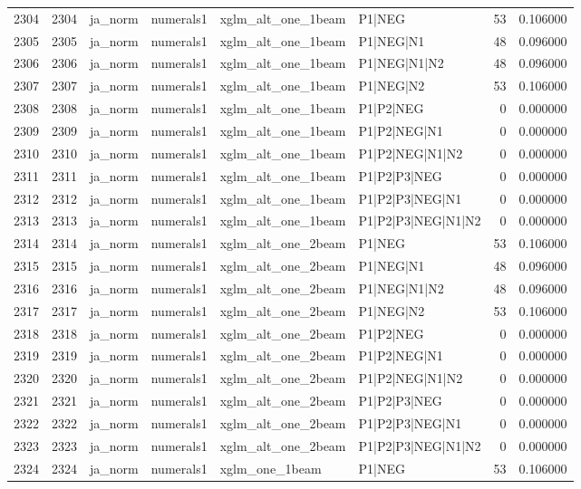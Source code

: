 \begin{tabular}{lrllllrr}
2304 & 2304 & ja_norm & numerals1 & xglm_alt_one_1beam & P1|NEG & 53 & 0.106000 \\
2305 & 2305 & ja_norm & numerals1 & xglm_alt_one_1beam & P1|NEG|N1 & 48 & 0.096000 \\
2306 & 2306 & ja_norm & numerals1 & xglm_alt_one_1beam & P1|NEG|N1|N2 & 48 & 0.096000 \\
2307 & 2307 & ja_norm & numerals1 & xglm_alt_one_1beam & P1|NEG|N2 & 53 & 0.106000 \\
2308 & 2308 & ja_norm & numerals1 & xglm_alt_one_1beam & P1|P2|NEG & 0 & 0.000000 \\
2309 & 2309 & ja_norm & numerals1 & xglm_alt_one_1beam & P1|P2|NEG|N1 & 0 & 0.000000 \\
2310 & 2310 & ja_norm & numerals1 & xglm_alt_one_1beam & P1|P2|NEG|N1|N2 & 0 & 0.000000 \\
2311 & 2311 & ja_norm & numerals1 & xglm_alt_one_1beam & P1|P2|P3|NEG & 0 & 0.000000 \\
2312 & 2312 & ja_norm & numerals1 & xglm_alt_one_1beam & P1|P2|P3|NEG|N1 & 0 & 0.000000 \\
2313 & 2313 & ja_norm & numerals1 & xglm_alt_one_1beam & P1|P2|P3|NEG|N1|N2 & 0 & 0.000000 \\
2314 & 2314 & ja_norm & numerals1 & xglm_alt_one_2beam & P1|NEG & 53 & 0.106000 \\
2315 & 2315 & ja_norm & numerals1 & xglm_alt_one_2beam & P1|NEG|N1 & 48 & 0.096000 \\
2316 & 2316 & ja_norm & numerals1 & xglm_alt_one_2beam & P1|NEG|N1|N2 & 48 & 0.096000 \\
2317 & 2317 & ja_norm & numerals1 & xglm_alt_one_2beam & P1|NEG|N2 & 53 & 0.106000 \\
2318 & 2318 & ja_norm & numerals1 & xglm_alt_one_2beam & P1|P2|NEG & 0 & 0.000000 \\
2319 & 2319 & ja_norm & numerals1 & xglm_alt_one_2beam & P1|P2|NEG|N1 & 0 & 0.000000 \\
2320 & 2320 & ja_norm & numerals1 & xglm_alt_one_2beam & P1|P2|NEG|N1|N2 & 0 & 0.000000 \\
2321 & 2321 & ja_norm & numerals1 & xglm_alt_one_2beam & P1|P2|P3|NEG & 0 & 0.000000 \\
2322 & 2322 & ja_norm & numerals1 & xglm_alt_one_2beam & P1|P2|P3|NEG|N1 & 0 & 0.000000 \\
2323 & 2323 & ja_norm & numerals1 & xglm_alt_one_2beam & P1|P2|P3|NEG|N1|N2 & 0 & 0.000000 \\
2324 & 2324 & ja_norm & numerals1 & xglm_one_1beam & P1|NEG & 53 & 0.106000 \\

\end{tabular}
